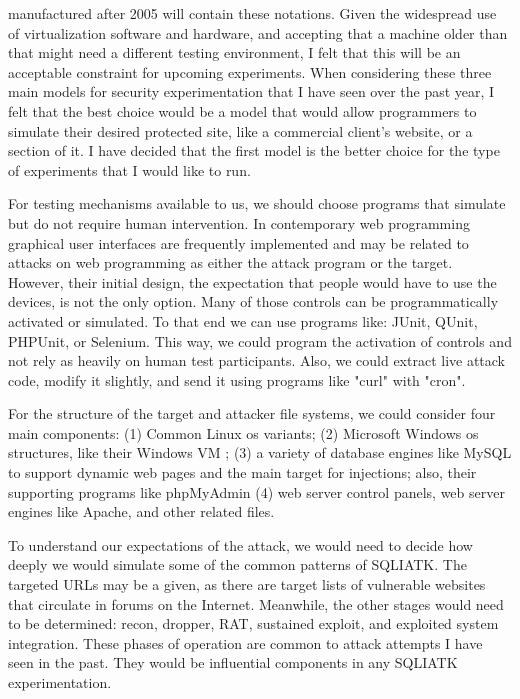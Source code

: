 manufactured after 2005 will contain these notations.  Given the widespread use of \gls{virtualization} software and hardware, and accepting that a machine older than that might need a different testing environment, I felt that this will be an acceptable constraint for upcoming experiments.  When considering these three main models for security experimentation that I have seen over the past year, I felt that the best choice would be a model that would allow programmers to simulate their desired protected site, like a commercial client's website, or a section of it.  I have decided that the first model is the better choice for the type of experiments that I would like to run.

For testing mechanisms available to us, we should choose programs that simulate but do not require human intervention.  In contemporary web programming graphical user interfaces are frequently implemented and may be related to attacks on web programming as either the \gls{attack} program or the target.  However, their initial design, the expectation that people would have to use the devices, is not the only option.  Many of those controls can be programmatically activated or simulated.  To that end we can use programs like: JUnit, QUnit, PHPUnit, or Selenium.  This way, we could program the activation of controls and not rely as heavily on human test participants.  Also, we could extract live \gls{attack} code, modify it slightly, and send it using programs like "curl" with "cron".

For the structure of the target and attacker file systems, we could consider four main components:  (1) Common Linux \gls{os} variants; (2) Microsoft Windows \gls{os} structures, like their Windows VM  ; (3) a variety of database engines like MySQL  to support dynamic web pages and the main target for injections; also, their supporting programs like phpMyAdmin  (4) web server control panels, web server engines like Apache, and other related files.

To understand our expectations of the \gls{attack}, we would need to decide how deeply we would simulate some of the common patterns of SQLIATK.  The targeted URLs may be a given, as there are target lists of vulnerable websites that circulate in forums on the Internet.  Meanwhile, the other stages would need to be determined:  recon, dropper, RAT, sustained \gls{exploit}, and exploited system integration.  These phases of operation are common to \gls{attack} attempts I have seen in the past.  They would be influential components in any SQLIATK experimentation.

